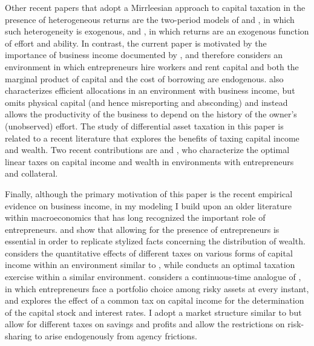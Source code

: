 \documentclass[11pt]{article}
\theoremstyle{plain}
\theoremstyle{definition} %
\begin{document}
Other recent papers that adopt a Mirrleesian approach to capital taxation in the presence of heterogeneous returns are the two-period models of \cite{gerritsen_optimal_2020} and \cite{boadway_optimal_2021}, in which such heterogeneity is exogenous, and \cite{kristjansson_optimal_2016}, in which returns are an exogenous function of effort and ability. In contrast, the current paper is motivated by the importance of business income documented by \cite{smith_capitalists_2019}, and therefore considers an environment in which entrepreneurs hire workers and rent capital and both the marginal product of capital and the cost of borrowing are endogenous. \cite{phelan_optimal_2021} also characterizes efficient allocations in an environment with business income, but omits physical capital (and hence misreporting and absconding) and instead allows the productivity of the business to depend on the history of the owner's (unobserved) effort. The study of differential asset taxation in this paper is related to a recent literature that explores the benefits of taxing capital income and wealth. Two recent contributions are \cite{boar_optimal_2022} and \cite{guvenen_use_2019}, who characterize the optimal linear taxes on capital income and wealth in environments with entrepreneurs and collateral. 

Finally, although the primary motivation of this paper is the recent empirical evidence on business income, in my modeling I build upon an older literature within macroeconomics that has long recognized the important role of entrepreneurs. \cite{quadrini_entrepreneurship_2000} and \cite{cagetti_entrepreneurship_2006} show that allowing for the presence of entrepreneurs is essential in order to replicate stylized facts concerning the distribution of wealth. \cite{kitao_entrepreneurship_2008} considers the quantitative effects of different taxes on various forms of capital income within an environment similar to \cite{cagetti_entrepreneurship_2006}, while \cite{bruggemann_higher_2021} conducts an optimal taxation exercise within a similar environment. \cite{panousi_capital_2010} considers a continuous-time analogue of \cite{angeletos_uninsured_2007}, in which entrepreneurs face a portfolio choice among risky assets at every instant, and explores the effect of a common tax on capital income for the determination of the capital stock and interest rates. I adopt a market structure similar to \cite{panousi_capital_2010} but allow for different taxes on savings and profits and allow the restrictions on risk-sharing to arise endogenously from agency frictions.  
\end{document}
